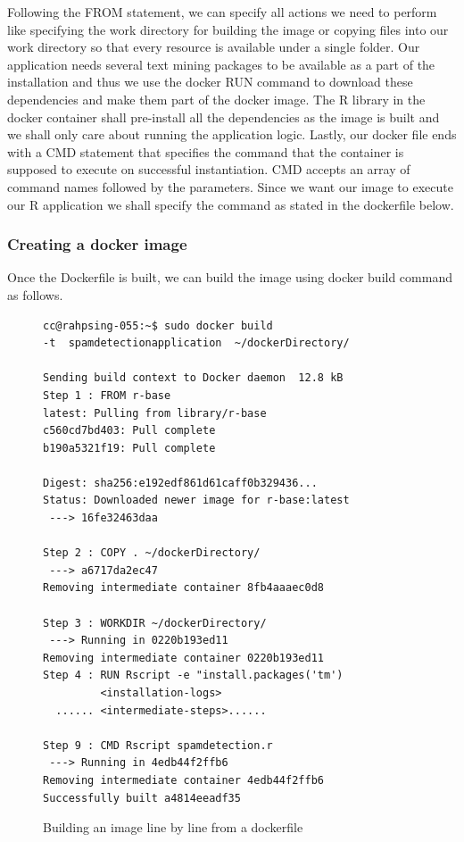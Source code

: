 \documentclass[9pt,twocolumn,twoside]{../../styles/osajnl}
\begin{document}
{\noindent
Following the FROM statement, we can specify all actions we need to
perform like specifying the work directory for building the image or
copying files into our work directory so that every resource is
available under a single folder. Our application needs several text
mining packages to be available as a part of the installation and thus
we use the docker RUN command to download these dependencies and make
them part of the docker image. The R library in the docker container
shall pre-install all the dependencies as the image is built and we
shall only care about running the application logic. Lastly, our
docker file ends with a CMD statement that specifies the command that
the container is supposed to execute on successful instantiation. CMD
accepts an array of command names followed by the parameters. Since we
want our image to execute our R application we shall specify the
command as stated in the dockerfile below.

\subsubsection{Creating a docker image}
Once the Dockerfile is built, we can build the image using docker
build command as follows.
\begin{figure}[h]
\begin{verbatim}
cc@rahpsing-055:~$ sudo docker build 
-t  spamdetectionapplication  ~/dockerDirectory/

Sending build context to Docker daemon  12.8 kB
Step 1 : FROM r-base
latest: Pulling from library/r-base
c560cd7bd403: Pull complete 
b190a5321f19: Pull complete 

Digest: sha256:e192edf861d61caff0b329436...
Status: Downloaded newer image for r-base:latest
 ---> 16fe32463daa

Step 2 : COPY . ~/dockerDirectory/
 ---> a6717da2ec47
Removing intermediate container 8fb4aaaec0d8

Step 3 : WORKDIR ~/dockerDirectory/
 ---> Running in 0220b193ed11
Removing intermediate container 0220b193ed11
Step 4 : RUN Rscript -e "install.packages('tm')
         <installation-logs>
  ...... <intermediate-steps>......

Step 9 : CMD Rscript spamdetection.r
 ---> Running in 4edb44f2ffb6
Removing intermediate container 4edb44f2ffb6
Successfully built a4814eeadf35
\end{verbatim}
\caption{Building an image line by line from a dockerfile}
\label{Building an image from a dockerfile}
\end{figure}

}
\end{document}
